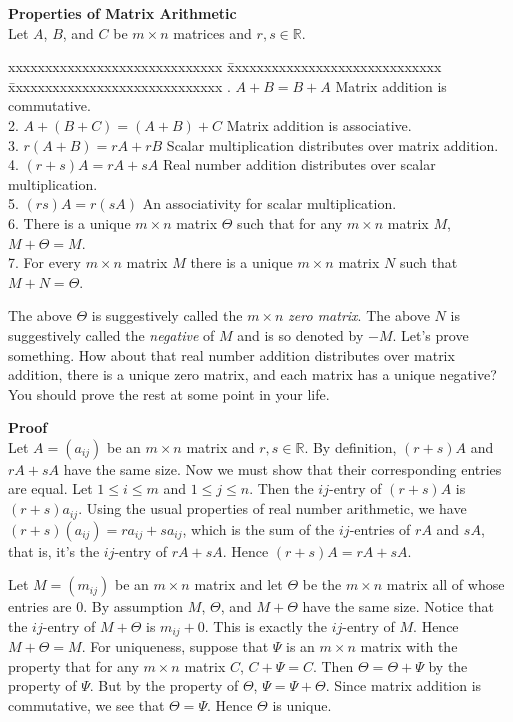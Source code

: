 \documentclass[12pt]{article}
\def\R{\mathbb{R}} \def\Q{\mathbb{Q}} \def\N{\mathbb{N}} \def\Z{\mathbb{Z}} \def\P{\mathbb{P}}
\def\bttt{\begin{tabbing}
xxxxxxxxxxxxxxxxxxxxxxxxxxxxx \=
xxxxxxxxxxxxxxxxxxxxxxxxxxxxx \=
xxxxxxxxxxxxxxxxxxxxxxxxxxxxx \kill}
\def\etb{\end{tabbing}}
\begin{document}
\begin{framed}
	{\bf Properties of Matrix Arithmetic} \\
	Let $A$, $B$, and $C$ be $m \times n$ matrices and $r, s \in \R$. 
	\bttt
	1. $A + B = B + A$ \> Matrix addition is commutative. \> \\[.05in]
	2. $A + (B + C) = (A + B) + C$  \>  Matrix addition is associative. \> \\[.05in]
	3. $r(A + B) = rA + rB$ \> Scalar multiplication distributes over matrix addition. \> \\[.05in]
	4. $(r + s)A = rA + sA$ \> Real number addition distributes over scalar multiplication. \> \\[.05in]
	5. $(rs)A = r(sA)$ \> An associativity for scalar multiplication. \> \\[.05in]
	6. There is a unique $m \times n$ matrix $\Theta$ such that for any $m \times n$ matrix $M$, $M + \Theta = M$. \> \ \> \\[.05in]
	7. For every $m \times n$ matrix $M$ there is a unique $m \times n$ matrix $N$ such that $M + N = \Theta$. \> \ \> 
	\etb
\end{framed}

The above $\Theta$ is suggestively called the $m \times n$ {\itshape zero matrix}.
The above $N$ is suggestively called the {\itshape negative} of $M$ and is so  denoted by $-M$. Let's prove something. How about that real number addition distributes over matrix addition, there is a unique zero matrix, and each matrix has a unique negative? You should prove the rest at some point in your life.

{\bf Proof} \\
Let $A = (a_{ij})$ be an $m \times n$ matrix and $r, s \in \R$. By definition, $(r + s)A$ and $rA + sA$ have the same size. Now we must show that their corresponding entries are equal.  Let $1 \leq i \leq m$ and $1 \leq j \leq n$. Then the $ij$-entry of $(r + s)A$ is $(r + s)a_{ij}$. Using the usual properties of real number arithmetic, we have $(r + s)(a_{ij}) = ra_{ij} + sa_{ij}$, which is the sum of the $ij$-entries of $rA$ and $sA$, that is, it's the $ij$-entry of $rA + sA$. Hence $(r + s)A = rA + sA$. 

Let $M = (m_{ij})$ be an $m \times n$ matrix and let $\Theta$ be the $m \times n$ matrix all of whose entries are $0$. By assumption $M$, $\Theta$, and $M + \Theta$
have the same size. Notice that the $ij$-entry of $M + \Theta$ is $m_{ij} + 0$. This is exactly the $ij$-entry of $M$. Hence $M + \Theta = M$. For uniqueness, suppose that $\Psi$ is an $m \times n$ matrix with the property that for any $m \times n$ matrix $C$, $C + \Psi = C$. Then $\Theta = \Theta + \Psi$ by the property of $\Psi$. But by the property of $\Theta$, $\Psi = \Psi + \Theta$. Since matrix addition is commutative, we see that $\Theta = \Psi$. Hence $\Theta$ is unique.
\end{document}

